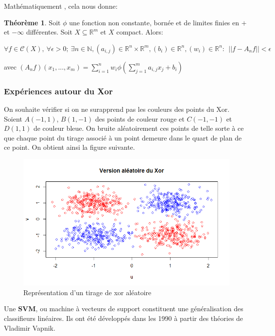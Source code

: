 \documentclass{article}
\theoremstyle{definition}
\newtheorem{thm}{Théorème}
\newcommand{\R}{\mathbb R}
\begin{document}
\newpage
\noindent Mathématiquement , cela nous donne:
\begin{thm}
Soit $\phi$ une fonction non constante, bornée et de limites finies en $+$ et $-\infty$ différentes. Soit $X \subseteq \R^m$ et $X$ compact. Alors:

\noindent $\forall f \in \mathcal{C}(X),~\forall \epsilon>0;~\exists n\in \mathbb{N},(a_{i,j})\in\R^n\times\R^m,(b_i)\in \R^n,(w_i)\in\R^n:~~||f-A_n f||<\epsilon$

\noindent avec $(A_n f)(x_1,...,x_m)=\displaystyle\sum_{i=1}^n w_i \phi\left(\displaystyle\sum_{j=1}^m a_{i,j}x_j+b_i\right)$
\end{thm}

\subsubsection{Expériences autour du Xor}

\noindent On souhaite vérifier si on ne surapprend pas les couleurs des points du Xor. Soient $A(-1,1)$, $B(1,-1)$ des points de couleur rouge et $C(-1,-1)$ et $D(1,1)$ de couleur bleue. On bruite aléatoirement ces points de telle sorte à ce que chaque point du tirage associé à un point demeure dans le quart de plan de ce point. On obtient ainsi la figure suivante.

\begin{figure}[!h]\centering
\includegraphics[scale=0.5]{xoralea.png}
\caption{Représentation d'un tirage de xor aléatoire}
\label{fig:xoralea}%
\end{figure}

\noindent Une \textbf{SVM}, ou machine à vecteurs de support constituent une généralisation des classifieurs linéaires. Ils ont été développés dans les 1990 à partir des théories de Vladimir Vapnik.
\end{document}
